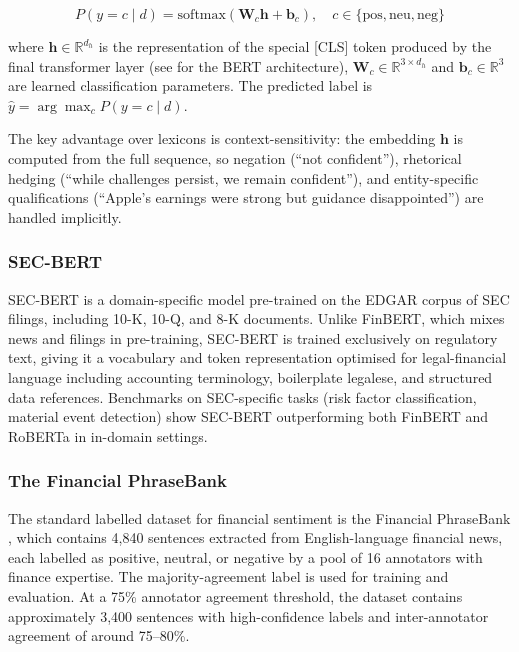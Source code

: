 \begin{equation}
  \label{eq:finbert-classifier}
  P(y = c \mid d) = \text{softmax}(\mathbf{W}_c \mathbf{h} + \mathbf{b}_c), \quad c \in \{\text{pos}, \text{neu}, \text{neg}\}
\end{equation}

where $\mathbf{h} \in \mathbb{R}^{d_h}$ is the representation of the special [CLS] token produced by the final transformer layer (see  for the BERT architecture), $\mathbf{W}_c \in \mathbb{R}^{3 \times d_h}$ and $\mathbf{b}_c \in \mathbb{R}^3$ are learned classification parameters. The predicted label is $\hat{y} = \arg\max_c P(y = c \mid d)$.

The key advantage over lexicons is context-sensitivity: the embedding $\mathbf{h}$ is computed from the full sequence, so negation (``not confident''), rhetorical hedging (``while challenges persist, we remain confident''), and entity-specific qualifications (``Apple's earnings were strong but guidance disappointed'') are handled implicitly.

\subsubsection*{SEC-BERT}

SEC-BERT \citep{loukas2022secbert} is a domain-specific model pre-trained on the EDGAR corpus of SEC filings, including 10-K, 10-Q, and 8-K documents. Unlike FinBERT, which mixes news and filings in pre-training, SEC-BERT is trained exclusively on regulatory text, giving it a vocabulary and token representation optimised for legal-financial language including accounting terminology, boilerplate legalese, and structured data references. Benchmarks on SEC-specific tasks (risk factor classification, material event detection) show SEC-BERT outperforming both FinBERT and RoBERTa in in-domain settings.

\subsubsection*{The Financial PhraseBank}

The standard labelled dataset for financial sentiment is the Financial PhraseBank \cite{malo2014phrasebank}, which contains 4,840 sentences extracted from English-language financial news, each labelled as positive, neutral, or negative by a pool of 16 annotators with finance expertise. The majority-agreement label is used for training and evaluation. At a 75\% annotator agreement threshold, the dataset contains approximately 3,400 sentences with high-confidence labels and inter-annotator agreement of around 75--80\%.

